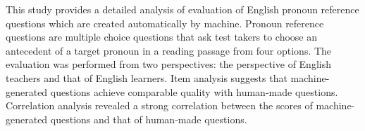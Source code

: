 This study provides a detailed analysis of evaluation of English pronoun reference questions which are created automatically by machine. Pronoun reference questions are multiple choice questions that ask test takers to choose an antecedent of a target pronoun in a reading passage from four options. The evaluation was performed from two perspectives: the perspective of English teachers and that of English learners. Item analysis suggests that machine-generated questions achieve comparable quality with human-made questions. Correlation analysis revealed a strong correlation between the scores of machine-generated questions and that of human-made questions.
